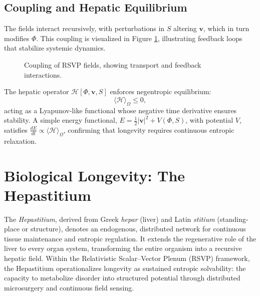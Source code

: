 \documentclass[12pt]{article}
\begin{document}
\subsection{Coupling and Hepatic Equilibrium}
\label{subsec:coupling}

The fields interact recursively, with perturbations in \(S\) altering \(\mathbf{v}\), which in turn modifies \(\Phi\). This coupling is visualized in Figure \ref{fig:field_coupling}, illustrating feedback loops that stabilize systemic dynamics.

\begin{figure}[h]
\centering
{}
\caption{Coupling of RSVP fields, showing transport and feedback interactions.}
\label{fig:field_coupling}
\end{figure}

The hepatic operator \(\mathcal{H}[\Phi, \mathbf{v}, S]\) enforces negentropic equilibrium:
\begin{equation}
\langle \mathcal{H} \rangle_\Omega \le 0,
\label{eq:hepatic_equilibrium}
\end{equation}
acting as a Lyapunov-like functional whose negative time derivative ensures stability. A simple energy functional, \(E = \frac{1}{2} |\mathbf{v}|^2 + V(\Phi, S)\), with potential \(V\), satisfies \(\frac{dE}{dt} \propto \langle \mathcal{H} \rangle_\Omega\), confirming that longevity requires continuous entropic relaxation.

\section{Biological Longevity: The Hepastitium}
\label{sec:hepastitium}

The \emph{Hepastitium}, derived from Greek \emph{hepar} (liver) and Latin \emph{stitium} (standing-place or structure), denotes an endogenous, distributed network for continuous tissue maintenance and entropic regulation.  
It extends the regenerative role of the liver to every organ system, transforming the entire organism into a recursive hepatic field.  
Within the Relativistic Scalar--Vector Plenum (RSVP) framework, the Hepastitium operationalizes longevity as sustained entropic solvability: the capacity to metabolize disorder into structured potential through distributed microsurgery and continuous field sensing.
\end{document}
